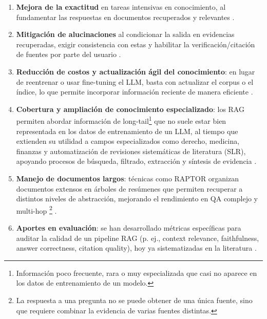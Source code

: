 \begin{enumerate}
    \item \textbf{Mejora de la exactitud} en tareas intensivas en conocimiento, al fundamentar las respuestas en documentos recuperados y relevantes \parencite{gao2023rag,zhao2024rag}.
    \item \textbf{Mitigación de alucinaciones} al condicionar la salida en evidencias recuperadas, exigir consistencia con estas y habilitar la verificación/citación de fuentes por parte del usuario \parencite{zhang2025hallucination,fan2024ragllm}.
    \item \textbf{Reducción de costos y actualización ágil del conocimiento}: en lugar de reentrenar o usar fine-tuning el LLM, basta con actualizar el corpus o el índice, lo que permite incorporar información reciente de manera eficiente \parencite{gao2023rag,zhai2024llmIR}.
    \item \textbf{Cobertura y ampliación de conocimiento especializado}: los RAG permiten abordar información de long-tail\footnote{Información poco frecuente, rara o muy especializada que casi no aparece en los datos de entrenamiento de un modelo.} que no suele estar bien representada en los datos de entrenamiento de un LLM, al tiempo que extienden su utilidad a campos especializados como derecho, medicina, finanzas y automatización de revisiones sistemáticas de literatura (SLR), apoyando procesos de búsqueda, filtrado, extracción y síntesis de evidencia \parencite{gao2023rag,hu2024ragrau,zhai2024llmIR}.
    \item \textbf{Manejo de documentos largos}: técnicas como RAPTOR organizan documentos extensos en árboles de resúmenes que permiten recuperar a distintos niveles de abstracción, mejorando el rendimiento en QA complejo y multi-hop \footnote{La respuesta a una pregunta no se puede obtener de una única fuente, sino que requiere combinar la evidencia de varias fuentes distintas.} \parencite{sarthi2024raptor}.
    \item \textbf{Aportes en evaluación}: se han desarrollado métricas específicas para auditar la calidad de un pipeline RAG (p. ej., context relevance, faithfulness, answer correctness, citation quality), hoy ya sistematizadas en la literatura \parencite{knollmeyer2024benchmarking}.
\end{enumerate}

